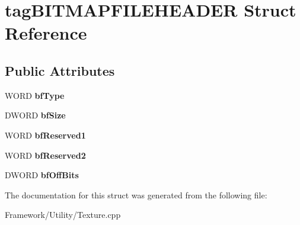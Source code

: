 \hypertarget{structtag_b_i_t_m_a_p_f_i_l_e_h_e_a_d_e_r}{}\section{tag\+B\+I\+T\+M\+A\+P\+F\+I\+L\+E\+H\+E\+A\+D\+ER Struct Reference}
\label{structtag_b_i_t_m_a_p_f_i_l_e_h_e_a_d_e_r}
\subsection*{Public Attributes}
\begin{DoxyCompactItemize}
\item 
W\+O\+RD {\bfseries bf\+Type}\hypertarget{structtag_b_i_t_m_a_p_f_i_l_e_h_e_a_d_e_r_a64ced0b35fb93012ce3d66b2f1dd5bb8}{}\label{structtag_b_i_t_m_a_p_f_i_l_e_h_e_a_d_e_r_a64ced0b35fb93012ce3d66b2f1dd5bb8}

\item 
D\+W\+O\+RD {\bfseries bf\+Size}\hypertarget{structtag_b_i_t_m_a_p_f_i_l_e_h_e_a_d_e_r_ad6fa0d3a907934d597b2773bc45e4d43}{}\label{structtag_b_i_t_m_a_p_f_i_l_e_h_e_a_d_e_r_ad6fa0d3a907934d597b2773bc45e4d43}

\item 
W\+O\+RD {\bfseries bf\+Reserved1}\hypertarget{structtag_b_i_t_m_a_p_f_i_l_e_h_e_a_d_e_r_aee794445cde1ce265644c1718afc6b52}{}\label{structtag_b_i_t_m_a_p_f_i_l_e_h_e_a_d_e_r_aee794445cde1ce265644c1718afc6b52}

\item 
W\+O\+RD {\bfseries bf\+Reserved2}\hypertarget{structtag_b_i_t_m_a_p_f_i_l_e_h_e_a_d_e_r_a017d814d24a7c65de297be31856501dc}{}\label{structtag_b_i_t_m_a_p_f_i_l_e_h_e_a_d_e_r_a017d814d24a7c65de297be31856501dc}

\item 
D\+W\+O\+RD {\bfseries bf\+Off\+Bits}\hypertarget{structtag_b_i_t_m_a_p_f_i_l_e_h_e_a_d_e_r_a5740a971a88afb51b014f54d9eb1c95c}{}\label{structtag_b_i_t_m_a_p_f_i_l_e_h_e_a_d_e_r_a5740a971a88afb51b014f54d9eb1c95c}

\end{DoxyCompactItemize}


The documentation for this struct was generated from the following file\+:\begin{DoxyCompactItemize}
\item 
Framework/\+Utility/Texture.\+cpp\end{DoxyCompactItemize}
